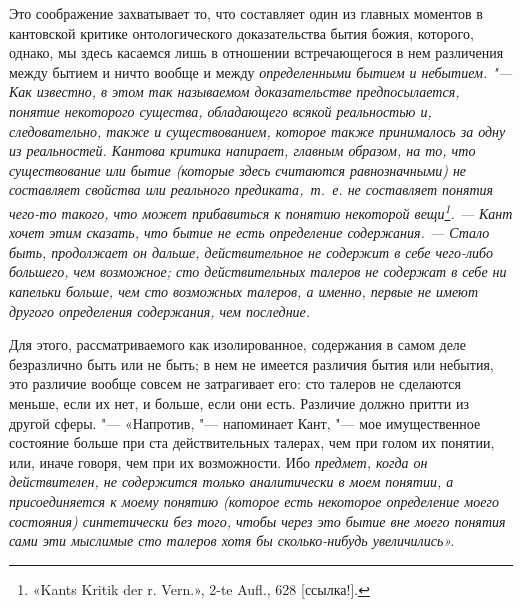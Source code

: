 Это соображение захватывает то, что составляет один из главных моментов в
кантовской критике онтологического доказательства бытия божия, которого,
однако, мы здесь касаемся лишь в отношении встречающегося в нем различения
между бытием и ничто вообще и между \em{определенными}
бытием и небытием. "--- Как известно, в этом так называемом доказательстве
предпосылается, понятие некоторого существа, обладающего всякой реальностью
и, следовательно, также и существованием, которое также принималось за одну
из реальностей. Кантова критика напирает, главным образом, на то, что
\em{существование} или бытие (которые здесь считаются
равнозначными) не составляет \em{свойства} или
\em{реального предиката},~т.~е. не составляет понятия
чего-то такого, что может прибавиться к \em{понятию}
некоторой вещи\footnote{ «Kants Kritik der r. Vern.», 2-te Aufl., 628
[ссылка!].}. --- Кант хочет этим сказать, что бытие не
есть определение содержания. --- Стало быть, продолжает он дальше,
действительное не содержит в себе чего-либо большего, чем возможное; сто
действительных талеров не содержат в себе ни капельки больше, чем сто
возможных талеров, а именно, первые не имеют другого определения
содержания, чем последние.

Для этого, рассматриваемого как изолированное, содержания в самом деле
безразлично быть или не быть; в нем не имеется различия бытия или небытия,
это различие вообще совсем не затрагивает его: сто талеров не сделаются
меньше, если их нет, и больше, если они есть. Различие должно притти из
другой сферы. "--- «Напротив, "--- напоминает Кант, "--- мое имущественное состояние
больше при ста действительных талерах, чем при голом их понятии, или, иначе
говоря, чем при их возможности. Ибо \em{предмет},
когда он действителен, не содержится только аналитически в моем понятии, а
\em{присоединяется к моему понятию} (которое есть
некоторое \em{определение} моего
\em{состояния}) \em{синтетически}
без того, чтобы через это бытие вне моего понятия сами эти мыслимые сто
талеров хотя бы сколько-нибудь увеличились».

